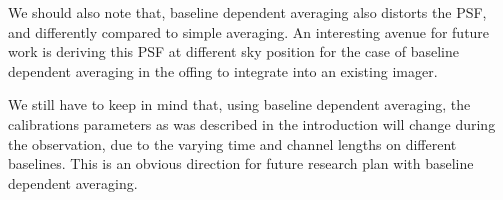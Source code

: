 \documentclass[useAMS,usenatbib]{mn2e}
\begin{document}
We should also note that, baseline dependent averaging also distorts the PSF, and differently compared 
to simple averaging. An interesting avenue for future work is deriving this PSF at different sky position
for the case of baseline dependent averaging in the offing to integrate into  an existing imager.

We still have to keep in mind that, using baseline dependent averaging, the calibrations parameters as was described in
the introduction will change during the observation, due to the varying time and channel lengths on different baselines.
This is an obvious direction for future research plan with baseline dependent averaging. 


\bsp
\label{lastpage}
\end{document}

